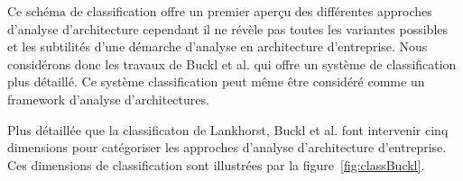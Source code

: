 Ce schéma de classification offre un premier aperçu des différentes approches d'analyse d'architecture cependant il ne révèle pas toutes les variantes possibles et les subtilités d'une démarche d'analyse en architecture d'entreprise. Nous considérons donc les travaux de Buckl  et al. qui offre un système de classification plus détaillé. Ce système classification peut même être considéré comme un framework d'analyse d'architectures.

Plus détaillée que la classificaton de Lankhorst, Buckl et al. \cite{buckl2009classifying} font intervenir cinq dimensions pour catégoriser les approches d'analyse d'architecture d'entreprise. Ces dimensions de classification sont illustrées par la figure~\ref{fig:classBuckl}.



